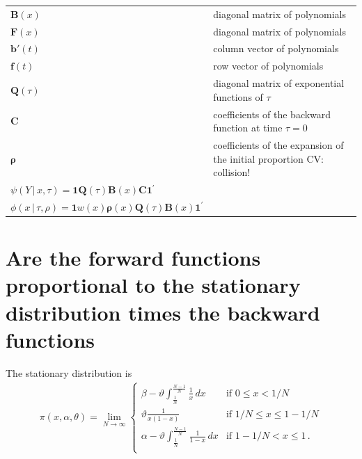 \documentclass[preprint]{elsarticle}
\newcommand{\bs}[1]{\ensuremath{\boldsymbol{#1}}}
\newcommand\given{{\,|\,}}
\newcommand\y{\ensuremath{Y}}
\begin{document}
\begin{table}[ht]
\begin{tabular}{l|l}
    $\mathbf{B}(x)$ &diagonal matrix of polynomials \\
    $\mathbf{F}(x)$ &diagonal matrix of polynomials \\
    $\bs{b}'(t)$ &column vector of polynomials \\
    $\bs{f}(t)$ &row vector of polynomials \\
    $\mathbf{Q}(\tau)$ &diagonal matrix of exponential functions of $\tau$\\
    $\mathbf{C}$ &coefficients of the backward function at time $\tau=0$\\
    $\mathbf{\rho}$ &coefficients of the expansion of the initial proportion {CV: collision!}\\
    $\psi(\y\given x,\tau)=\mathbf{1}\mathbf{Q}(\tau)\mathbf{B}(x)\mathbf{C}\mathbf{1}^{'}$\\
    $\phi(x\given\tau,\rho)=\mathbf{1}w(x)\mathbf{\rho}(x)\mathbf{Q}(\tau)\mathbf{B}(x)\mathbf{1}^{'}$\\
    \bottomrule
  \end{tabular}\label{jointSFScont}
\end{table}

\section{Are the forward functions proportional to the stationary distribution times the backward functions}

The stationary distribution is
\begin{align}\label{eq:forw_bounddrift-stat}
  \pi(x, \alpha, \theta) = \lim_{N\to\infty}
  \begin{cases}
    \beta-\vartheta \int_{\tfrac1N}^{\tfrac{N-1}N} \frac1x\,dx     & \text{if } 0 \leq x < 1/N         \\
    \vartheta\frac{1}{x(1-x)}                                                 & \text{if } 1/N \le x \le 1-1/N \\
    \alpha-\vartheta \int_{\tfrac1N}^{\tfrac{N-1}N} \frac1{1-x}\,dx  & \text{if } 1-1/N < x \leq 1 \,.      \\
\end{cases}
\end{align}
\end{document}
